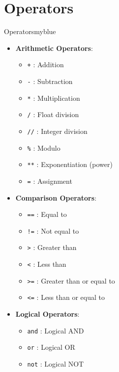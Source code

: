 \section{Operators}
\begin{prettyBox}{Operators}{myblue}
\begin{itemize}
    \item \textbf{Arithmetic Operators}:
        \begin{itemize}
            \item \texttt{+} : Addition
            \item \texttt{-} : Subtraction
            \item \texttt{*} : Multiplication
            \item \texttt{/} :  Float division 
            \item \texttt{//} : Integer division 
            \item \texttt{\%} : Modulo 
            \item \texttt{**} : Exponentiation (power)
            \item \texttt{=} : Assignment 
        \end{itemize}
    
    \item \textbf{Comparison Operators}:
        \begin{itemize}
            \item \texttt{==} : Equal to 
            \item \texttt{!=} : Not equal to 
            \item \texttt{>} : Greater than
            \item \texttt{<} : Less than
            \item \texttt{>=} : Greater than or equal to
            \item \texttt{<=} : Less than or equal to
        \end{itemize}

    \item \textbf{Logical Operators}:
        \begin{itemize}
            \item \texttt{and} : Logical AND 
            \item \texttt{or} : Logical OR 
            \item \texttt{not} : Logical NOT 
        \end{itemize}
\end{itemize}
\end{prettyBox}

